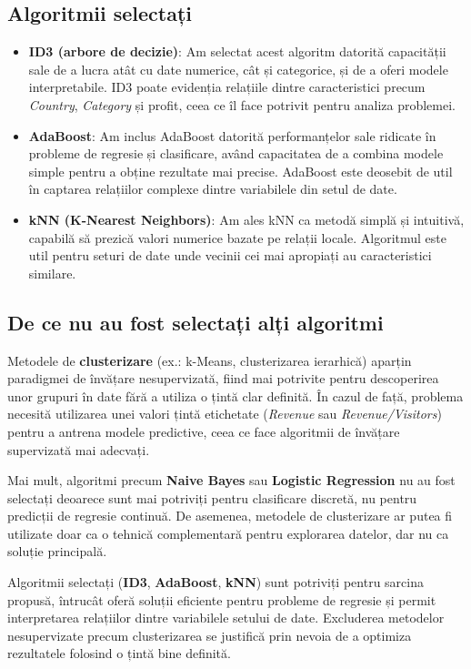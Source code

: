 \documentclass{article}
\begin{document}
\subsection*{Algoritmii selectați}
\begin{itemize}
    \item \textbf{ID3 (arbore de decizie)}: Am selectat acest algoritm datorită capacității sale de a lucra atât cu date numerice, cât și categorice, și de a oferi modele interpretabile. ID3 poate evidenția relațiile dintre caracteristici precum \textit{Country}, \textit{Category} și profit, ceea ce îl face potrivit pentru analiza problemei.
    \item \textbf{AdaBoost}: Am inclus AdaBoost datorită performanțelor sale ridicate în probleme de regresie și clasificare, având capacitatea de a combina modele simple pentru a obține rezultate mai precise. AdaBoost este deosebit de util în captarea relațiilor complexe dintre variabilele din setul de date.
    \item \textbf{kNN (K-Nearest Neighbors)}: Am ales kNN ca metodă simplă și intuitivă, capabilă să prezică valori numerice bazate pe relații locale. Algoritmul este util pentru seturi de date unde vecinii cei mai apropiați au caracteristici similare.
\end{itemize}

\subsection*{De ce nu au fost selectați alți algoritmi}
Metodele de \textbf{clusterizare} (ex.: k-Means, clusterizarea ierarhică) aparțin paradigmei de învățare nesupervizată, fiind mai potrivite pentru descoperirea unor grupuri în date fără a utiliza o țintă clar definită. În cazul de față, problema necesită utilizarea unei valori țintă etichetate (\textit{Revenue} sau \textit{Revenue/Visitors}) pentru a antrena modele predictive, ceea ce face algoritmii de învățare supervizată mai adecvați.

Mai mult, algoritmi precum \textbf{Naive Bayes} sau \textbf{Logistic Regression} nu au fost selectați deoarece sunt mai potriviți pentru clasificare discretă, nu pentru predicții de regresie continuă. De asemenea, metodele de clusterizare ar putea fi utilizate doar ca o tehnică complementară pentru explorarea datelor, dar nu ca soluție principală.

Algoritmii selectați (\textbf{ID3}, \textbf{AdaBoost}, \textbf{kNN}) sunt potriviți pentru sarcina propusă, întrucât oferă soluții eficiente pentru probleme de regresie și permit interpretarea relațiilor dintre variabilele setului de date. Excluderea metodelor nesupervizate precum clusterizarea se justifică prin nevoia de a optimiza rezultatele folosind o țintă bine definită.
\end{document}
